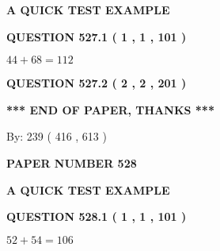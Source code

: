 \documentclass[12pt]{article}
\begin{document}
   
   
   
   
   
 \vspace{0.2in}
{\LARGE {\textbf{ A QUICK TEST EXAMPLE}}}
   
   
  
\vspace{0.2in}
  
{\textbf{\Large{QUESTION
527.1 
 ( 1 , 1 , 101 )
}}}
  
  
 
 

$ %
44 +  %
68=   %
112$
 
 
  
\vspace{0.2in}
  
{\textbf{\Large{QUESTION
527.2 
 ( 2 , 2 , 201 )
}}}
  
  
   
   
 \vspace{0.2in}
 
   
   
   
   
\vspace{1.0in} 
{\textbf{\large{ *** END OF PAPER, THANKS *** }}} 
   
   
\hspace{1.0in} By: 
 239 ( 416 ,  613 )
   
   
   
   
\newpage 
\setcounter{page}{ 
   528001 } 
   
   
   
   
 {\textbf{ \Large{ PAPER NUMBER  528  }}}
   
   
\vspace{0.2in}
   
   
   
   
   
   
 \vspace{0.2in}
{\LARGE {\textbf{ A QUICK TEST EXAMPLE}}}
   
   
  
\vspace{0.2in}
  
{\textbf{\Large{QUESTION
528.1 
 ( 1 , 1 , 101 )
}}}
  
  
 
 

$ %
52 +  %
54=   %
106$
 
\end{document}
